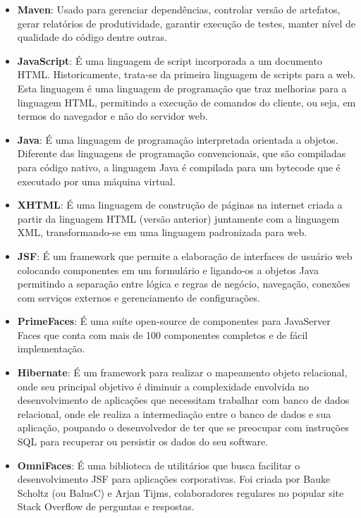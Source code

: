 \documentclass[chapter=TITLE,12pt,oneside,a4paper,english,french,sumario=tradicional,spanish,brazil,]{abntex2}
\begin{document}
\begin{itemize}
\item \textbf{Maven}: Usado para gerenciar dependências, controlar versão de artefatos, gerar relatórios de produtividade, garantir execução de testes, manter nível de qualidade do código dentre outras.

\item	\textbf{JavaScript}: É uma linguagem de script incorporada a um documento HTML. Historicamente, trata-se da primeira linguagem de scripts para a web. Esta linguagem é uma linguagem de programação que traz melhorias para a linguagem HTML, permitindo a execução de comandos do cliente, ou seja, em termos do navegador e não do servidor web.

\item	\textbf{Java}: É uma linguagem de programação interpretada orientada a objetos. Diferente das linguagens de programação convencionais, que são compiladas para código nativo, a linguagem Java é compilada para um bytecode que é executado por uma máquina virtual.

\item	\textbf{XHTML}: É uma linguagem de construção de páginas na internet criada a partir da linguagem HTML (versão anterior) juntamente com a linguagem XML, transformando-se em uma linguagem padronizada para web.

\item	\textbf{JSF}: É um framework que permite a elaboração de interfaces de usuário web colocando componentes em um formulário e ligando-os a objetos Java permitindo a separação entre lógica e regras de negócio, navegação, conexões com serviços externos e gerenciamento de configurações.

\item	\textbf{PrimeFaces}: É uma suíte open-source de componentes para JavaServer Faces que conta com mais de 100 componentes completos e de fácil implementação.

\item	\textbf{Hibernate}: É um framework para realizar o mapeamento objeto relacional, onde seu principal objetivo é diminuir a complexidade envolvida no desenvolvimento de aplicações que necessitam trabalhar com banco de dados relacional, onde ele realiza a intermediação entre o banco de dados e sua aplicação, poupando o desenvolvedor de ter que se preocupar com instruções SQL para recuperar ou persistir os dados do seu software.

\item	\textbf{OmniFaces}: É uma biblioteca de utilitários que busca facilitar o desenvolvimento JSF para aplicações corporativas. Foi criada por Bauke Scholtz (ou BalusC) e Arjan Tijms, colaboradores regulares no popular site Stack Overflow de perguntas e respostas.


\end{itemize}
\end{document}
